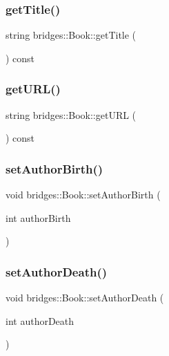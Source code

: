 \subsubsection{\texorpdfstring{getTitle()}{getTitle()}}
{\footnotesize\ttfamily string bridges\+::\+Book\+::get\+Title (\begin{DoxyParamCaption}{ }\end{DoxyParamCaption}) const\hspace{0.3cm}{\ttfamily [inline]}}

\mbox{\label{classbridges_1_1_book_a3facf86f7560e974ec7cd81e0fc58800}} 
\subsubsection{\texorpdfstring{getURL()}{getURL()}}
{\footnotesize\ttfamily string bridges\+::\+Book\+::get\+U\+RL (\begin{DoxyParamCaption}{ }\end{DoxyParamCaption}) const\hspace{0.3cm}{\ttfamily [inline]}}

\mbox{\label{classbridges_1_1_book_adca4d6766fa0068e23926ae95ed8411f}} 
\subsubsection{\texorpdfstring{setAuthorBirth()}{setAuthorBirth()}}
{\footnotesize\ttfamily void bridges\+::\+Book\+::set\+Author\+Birth (\begin{DoxyParamCaption}\item[{int}]{author\+Birth }\end{DoxyParamCaption})\hspace{0.3cm}{\ttfamily [inline]}}

\mbox{\label{classbridges_1_1_book_a044ad1b1b6418d7545c6f957b2757bcd}} 
\subsubsection{\texorpdfstring{setAuthorDeath()}{setAuthorDeath()}}
{\footnotesize\ttfamily void bridges\+::\+Book\+::set\+Author\+Death (\begin{DoxyParamCaption}\item[{int}]{author\+Death }\end{DoxyParamCaption})\hspace{0.3cm}{\ttfamily [inline]}}

